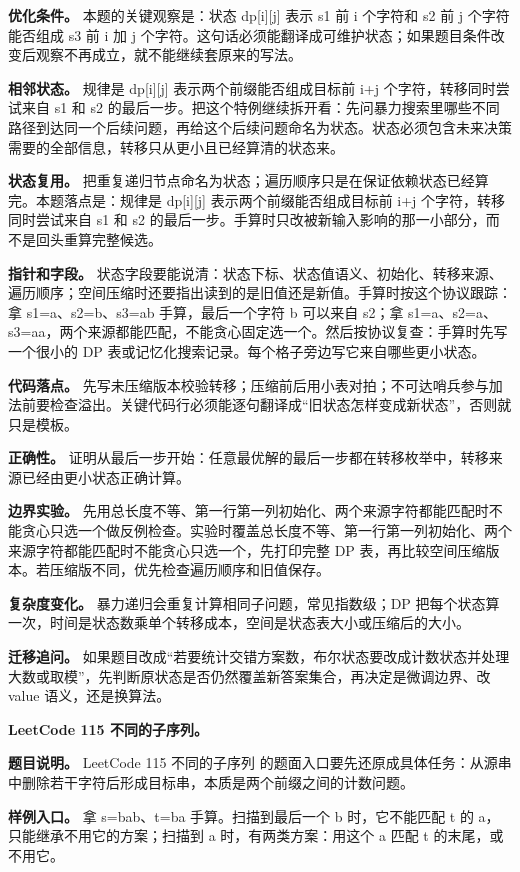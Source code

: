 \textbf{优化条件。} 本题的关键观察是：状态 dp[i][j] 表示 s1 前 i 个字符和 s2 前 j 个字符能否组成 s3 前 i 加 j 个字符。这句话必须能翻译成可维护状态；如果题目条件改变后观察不再成立，就不能继续套原来的写法。

\textbf{相邻状态。} 规律是 dp[i][j] 表示两个前缀能否组成目标前 i+j 个字符，转移同时尝试来自 s1 和 s2 的最后一步。把这个特例继续拆开看：先问暴力搜索里哪些不同路径到达同一个后续问题，再给这个后续问题命名为状态。状态必须包含未来决策需要的全部信息，转移只从更小且已经算清的状态来。

\textbf{状态复用。} 把重复递归节点命名为状态；遍历顺序只是在保证依赖状态已经算完。本题落点是：规律是 dp[i][j] 表示两个前缀能否组成目标前 i+j 个字符，转移同时尝试来自 s1 和 s2 的最后一步。手算时只改被新输入影响的那一小部分，而不是回头重算完整候选。

\textbf{指针和字段。} 状态字段要能说清：状态下标、状态值语义、初始化、转移来源、遍历顺序；空间压缩时还要指出读到的是旧值还是新值。手算时按这个协议跟踪：拿 s1=a、s2=b、s3=ab 手算，最后一个字符 b 可以来自 s2；拿 s1=a、s2=a、s3=aa，两个来源都能匹配，不能贪心固定选一个。然后按协议复查：手算时先写一个很小的 DP 表或记忆化搜索记录。每个格子旁边写它来自哪些更小状态。

\textbf{代码落点。} 先写未压缩版本校验转移；压缩前后用小表对拍；不可达哨兵参与加法前要检查溢出。关键代码行必须能逐句翻译成“旧状态怎样变成新状态”，否则就只是模板。

\textbf{正确性。} 证明从最后一步开始：任意最优解的最后一步都在转移枚举中，转移来源已经由更小状态正确计算。

\textbf{边界实验。} 先用总长度不等、第一行第一列初始化、两个来源字符都能匹配时不能贪心只选一个做反例检查。实验时覆盖总长度不等、第一行第一列初始化、两个来源字符都能匹配时不能贪心只选一个，先打印完整 DP 表，再比较空间压缩版本。若压缩版不同，优先检查遍历顺序和旧值保存。

\textbf{复杂度变化。} 暴力递归会重复计算相同子问题，常见指数级；DP 把每个状态算一次，时间是状态数乘单个转移成本，空间是状态表大小或压缩后的大小。

\textbf{迁移追问。} 如果题目改成“若要统计交错方案数，布尔状态要改成计数状态并处理大数或取模”，先判断原状态是否仍然覆盖新答案集合，再决定是微调边界、改 value 语义，还是换算法。

\noindent\textbf{LeetCode 115 不同的子序列。}

\textbf{题目说明。} LeetCode 115 不同的子序列 的题面入口要先还原成具体任务：从源串中删除若干字符后形成目标串，本质是两个前缀之间的计数问题。

\textbf{样例入口。} 拿 s=bab、t=ba 手算。扫描到最后一个 b 时，它不能匹配 t 的 a，只能继承不用它的方案；扫描到 a 时，有两类方案：用这个 a 匹配 t 的末尾，或不用它。

